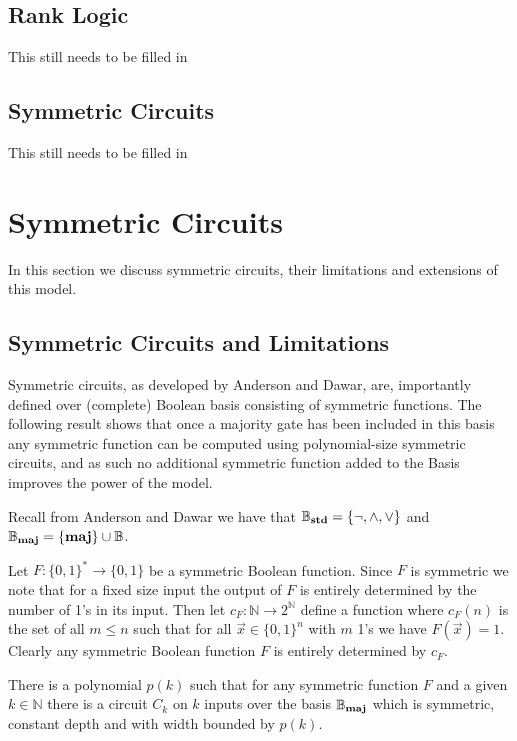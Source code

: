 \documentclass[12pt]{report}
\newcommand{\std}{\text{\textbf{std}}}
\newcommand{\maj}{\text{\textbf{maj}}}
\begin{document}
\section{Rank Logic}
This still needs to be filled in

\section{Symmetric Circuits}
This still needs to be filled in

\chapter{Symmetric Circuits}
In this section we discuss symmetric circuits, their limitations and extensions
of this model.

\section{Symmetric Circuits and Limitations}
Symmetric circuits, as developed by Anderson and Dawar, are, importantly defined
over (complete) Boolean basis consisting of symmetric functions. The following
result shows that once a majority gate has been included in this basis any
symmetric function can be computed using polynomial-size symmetric circuits, and
as such no additional symmetric function added to the Basis improves the power
of the model.

Recall from Anderson and Dawar \cite{AndersonD17} we have that $\mathbb{B}_{\std} = \{
\neg , \wedge , \lor \}$ and $\mathbb{B}_\maj = \{ \maj \} \cup \mathbb{B}$.

Let $F: \{0,1\}^* \rightarrow \{0,1\}$ be a symmetric Boolean function. Since
$F$ is symmetric we note that for a fixed size input the output of $F$ is
entirely determined by the number of 1's in its input. Then let
$c_{F}:\mathbb{N} \rightarrow 2^{\mathbb{N}}$ define a function where $c_{F}(n)$
is the set of all $m \leq n$ such that for all $\vec{x} \in \{ 0,1 \}^n$ with
$m$ 1's we have $F (\vec{x}) = 1$. Clearly any symmetric Boolean function $F$ is
entirely determined by $c_{F}$.
 
\begin{prop}
  \label{prop:fuctions-maj}
  There is a polynomial $p(k)$ such that for any symmetric function $F$ and a
  given $k \in \mathbb{N}$ there is a circuit $C_k$ on $k$ inputs over the basis
  $\mathbb{B}_\maj$ which is symmetric, constant depth and with width bounded by
  $p(k)$.
\end{prop}
\end{document}
